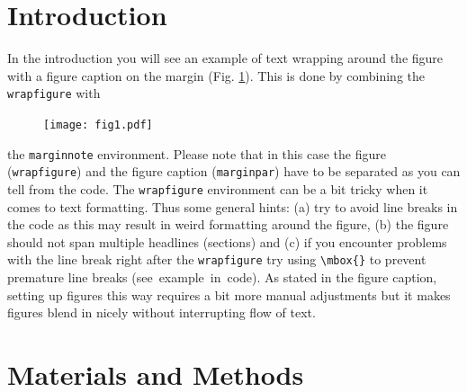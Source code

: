 \documentclass[10pt,letterpaper]{article}
\begin{document}
\section*{Introduction}
In the introduction you will see an example of text wrapping around the figure with a figure caption on the margin (Fig. \ref{fig1}). This is done by combining the \verb!wrapfigure! with %
\begin{figure}
\texttt{[image: fig1.pdf]}
\captionsetup{labelformat=empty} %
\caption{} %
\label{fig1} %
\end{figure} %
the \verb!marginnote! environment. Please note that in this case the figure (\verb!wrapfigure!) and the figure caption (\verb!marginpar!) have to be separated as you can tell from the code. The \verb!wrapfigure! environment can be a bit tricky when it comes to text formatting. Thus some general hints: (a) try to avoid line breaks in the code as this may result in weird formatting around the figure, (b) the figure should not span multiple headlines (sections) and (c) if you encounter problems with the line break right after the \verb!wrapfigure! try using \verb!\mbox{}! to prevent premature line breaks (\mbox{see example in code}). As stated in the figure caption, setting up figures this way requires a bit more manual adjustments but it makes figures blend in nicely without interrupting flow of text.

\section*{Materials and Methods}
\end{document}
